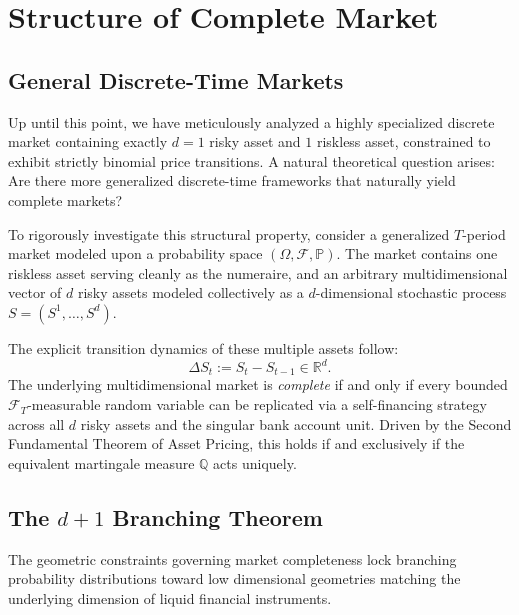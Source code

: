 \chapter{Structure of Complete Market}

\section{General Discrete-Time Markets}

Up until this point, we have meticulously analyzed a highly specialized discrete market containing exactly $d=1$ risky asset and $1$ riskless asset, constrained to exhibit strictly binomial price transitions. A natural theoretical question arises: Are there more generalized discrete-time frameworks that naturally yield complete markets? 

To rigorously investigate this structural property, consider a generalized $T$-period market modeled upon a probability space $(\Omega, \mathcal{F}, \mathbb{P})$. The market contains one riskless asset serving cleanly as the numeraire, and an arbitrary multidimensional vector of $d$ risky assets modeled collectively as a $d$-dimensional stochastic process $S = (S^1, \dots, S^d)$. 

The explicit transition dynamics of these multiple assets follow:
\begin{equation}
    \Delta S_t := S_t - S_{t-1} \in \mathbb{R}^d.
\end{equation}
The underlying multidimensional market is \textit{complete} if and only if every bounded $\mathcal{F}_T$-measurable random variable can be replicated via a self-financing strategy across all $d$ risky assets and the singular bank account unit. Driven by the Second Fundamental Theorem of Asset Pricing, this holds if and exclusively if the equivalent martingale measure $\mathbb{Q}$ acts uniquely.

\section{The \texorpdfstring{$d+1$}{d+1} Branching Theorem}

The geometric constraints governing market completeness lock branching probability distributions toward low dimensional geometries matching the underlying dimension of liquid financial instruments.

